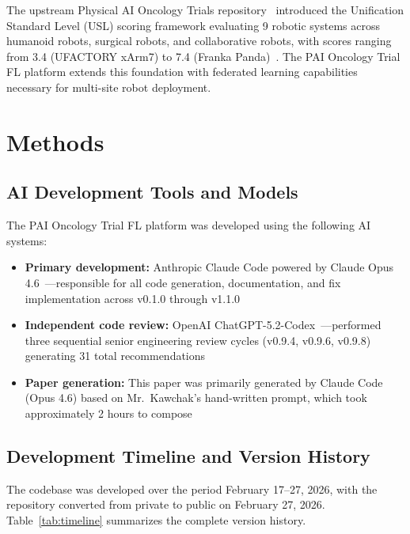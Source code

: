 \documentclass[10pt]{article}
\begin{document}
The upstream Physical AI Oncology Trials repository~\cite{kawchak2026physical} introduced the Unification Standard Level (USL) scoring framework evaluating 9 robotic systems across humanoid robots, surgical robots, and collaborative robots, with scores ranging from 3.4 (UFACTORY xArm7) to 7.4 (Franka Panda)~\cite{kawchak2026usl}. The PAI Oncology Trial FL platform extends this foundation with federated learning capabilities necessary for multi-site robot deployment.

\section{Methods}
\label{sec:methods}

\subsection{AI Development Tools and Models}

The PAI Oncology Trial FL platform was developed using the following AI systems:
\begin{itemize}
  \item \textbf{Primary development:} Anthropic Claude Code powered by Claude Opus 4.6~\cite{anthropic2026claude}---responsible for all code generation, documentation, and fix implementation across v0.1.0 through v1.1.0
  \item \textbf{Independent code review:} OpenAI ChatGPT-5.2-Codex~\cite{openai2026codex}---performed three sequential senior engineering review cycles (v0.9.4, v0.9.6, v0.9.8) generating 31 total recommendations
  \item \textbf{Paper generation:} This paper was primarily generated by Claude Code (Opus 4.6) based on Mr.\ Kawchak's hand-written prompt, which took approximately 2 hours to compose
\end{itemize}

\subsection{Development Timeline and Version History}

The codebase was developed over the period February 17--27, 2026, with the repository converted from private to public on February 27, 2026. Table~\ref{tab:timeline} summarizes the complete version history.
\end{document}
